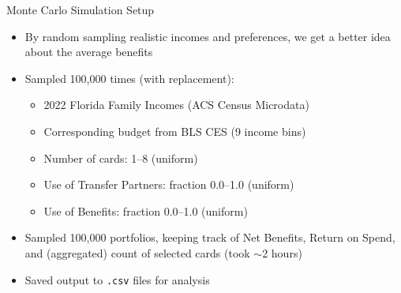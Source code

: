 \begin{frame}{Monte Carlo Simulation Setup}
    \begin{itemize}
        \item By random sampling realistic incomes and preferences, we get a better idea about the average benefits
        \bigskip
        \item Sampled 100,000 times (with replacement):
        \begin{itemize}
            \item 2022 Florida Family Incomes (ACS Census Microdata)
            \item Corresponding budget from BLS CES (9 income bins)
            \item Number of cards: 1--8 (uniform)
            \item Use of Transfer Partners: fraction 0.0--1.0 (uniform)
            \item Use of Benefits: fraction 0.0--1.0 (uniform)
        \end{itemize}
        \bigskip
        \item Sampled 100,000 portfolios, keeping track of Net Benefits, Return on Spend, and (aggregated) count of selected cards (took $\sim$2 hours)
        \item Saved output to \texttt{.csv} files for analysis
    \end{itemize}
\end{frame}

